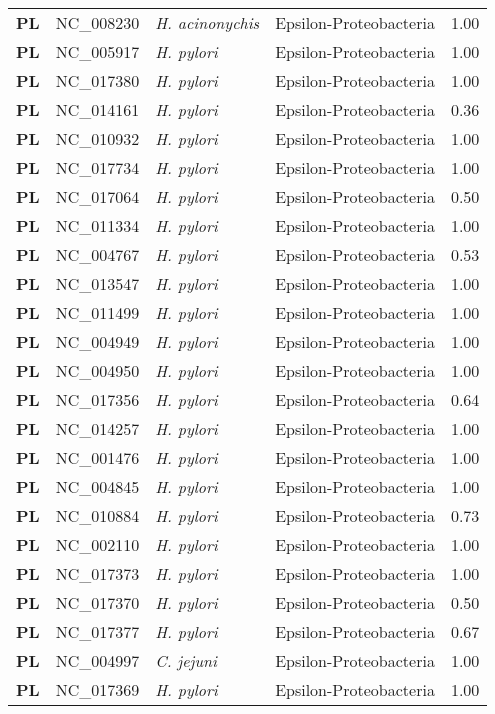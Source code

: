 \begin{adjustwidth}{-3cm}{2cm}
{\begin{supertabular}{>{\bfseries}l|p{0.1\textwidth}p{0.14\textwidth}l|l}
PL & NC\_008230 & \textit{H. acinonychis} & Epsilon-Proteobacteria & 1.00\\
PL & NC\_005917 & \textit{H. pylori} & Epsilon-Proteobacteria & 1.00\\
PL & NC\_017380 & \textit{H. pylori} & Epsilon-Proteobacteria & 1.00\\
PL & NC\_014161 & \textit{H. pylori} & Epsilon-Proteobacteria & 0.36\\
PL & NC\_010932 & \textit{H. pylori} & Epsilon-Proteobacteria & 1.00\\
PL & NC\_017734 & \textit{H. pylori} & Epsilon-Proteobacteria & 1.00\\
PL & NC\_017064 & \textit{H. pylori} & Epsilon-Proteobacteria & 0.50\\
PL & NC\_011334 & \textit{H. pylori} & Epsilon-Proteobacteria & 1.00\\
PL & NC\_004767 & \textit{H. pylori} & Epsilon-Proteobacteria & 0.53\\
PL & NC\_013547 & \textit{H. pylori} & Epsilon-Proteobacteria & 1.00\\
PL & NC\_011499 & \textit{H. pylori} & Epsilon-Proteobacteria & 1.00\\
PL & NC\_004949 & \textit{H. pylori} & Epsilon-Proteobacteria & 1.00\\
PL & NC\_004950 & \textit{H. pylori} & Epsilon-Proteobacteria & 1.00\\
PL & NC\_017356 & \textit{H. pylori} & Epsilon-Proteobacteria & 0.64\\
PL & NC\_014257 & \textit{H. pylori} & Epsilon-Proteobacteria & 1.00\\
PL & NC\_001476 & \textit{H. pylori} & Epsilon-Proteobacteria & 1.00\\
PL & NC\_004845 & \textit{H. pylori} & Epsilon-Proteobacteria & 1.00\\
PL & NC\_010884 & \textit{H. pylori} & Epsilon-Proteobacteria & 0.73\\
PL & NC\_002110 & \textit{H. pylori} & Epsilon-Proteobacteria & 1.00\\
PL & NC\_017373 & \textit{H. pylori} & Epsilon-Proteobacteria & 1.00\\
PL & NC\_017370 & \textit{H. pylori} & Epsilon-Proteobacteria & 0.50\\
PL & NC\_017377 & \textit{H. pylori} & Epsilon-Proteobacteria & 0.67\\
PL & NC\_004997 & \textit{C. jejuni} & Epsilon-Proteobacteria & 1.00\\
PL & NC\_017369 & \textit{H. pylori} & Epsilon-Proteobacteria & 1.00\\

\end{supertabular}}
\end{adjustwidth}
